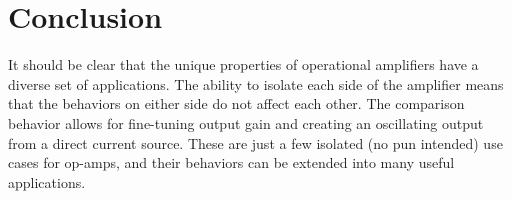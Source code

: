 \documentclass[journal]{IEEEtran}
\begin{document}
\section{Conclusion}
It should be clear that the unique properties of operational amplifiers have a diverse set of applications. The ability to isolate each side of the amplifier means that the behaviors on either side do not affect each other. The comparison behavior allows for fine-tuning output gain and creating an oscillating output from a direct current source. These are just a few isolated (no pun intended) use cases for op-amps, and their behaviors can be extended into many useful applications.
\end{document}
